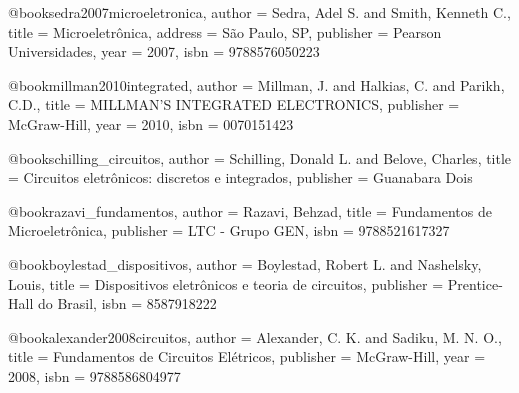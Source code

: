 


%

@book{sedra2007microeletronica,
  author = {Sedra, Adel S. and Smith, Kenneth C.},
  title = {Microeletrônica},
  address = {São Paulo, SP},
  publisher = {Pearson Universidades},
  year = {2007},
  isbn = {9788576050223}
}

@book{millman2010integrated,
  author = {Millman, J. and Halkias, C. and Parikh, C.D.},
  title = {MILLMAN'S INTEGRATED ELECTRONICS},
  publisher = {McGraw-Hill},
  year = {2010},
  isbn = {0070151423}
}

@book{schilling_circuitos,
  author = {Schilling, Donald L. and Belove, Charles},
  title = {Circuitos eletrônicos: discretos e integrados},
  publisher = {Guanabara Dois}
}

@book{razavi_fundamentos,
  author = {Razavi, Behzad},
  title = {Fundamentos de Microeletrônica},
  publisher = {LTC - Grupo GEN},
  isbn = {9788521617327}
}

@book{boylestad_dispositivos,
  author = {Boylestad, Robert L. and Nashelsky, Louis},
  title = {Dispositivos eletrônicos e teoria de circuitos},
  publisher = {Prentice-Hall do Brasil},
  isbn = {8587918222}
}

%

@book{alexander2008circuitos,
  author = {Alexander, C. K. and Sadiku, M. N. O.},
  title = {Fundamentos de Circuitos Elétricos},
  publisher = {McGraw-Hill},
  year = {2008},
  isbn = {9788586804977}
}

